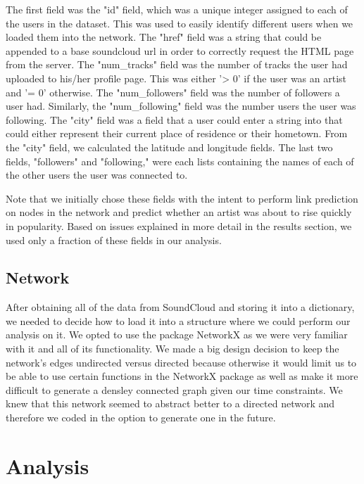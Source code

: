 \documentclass{article}
\begin{document}
The first field was the "id" field, which was a unique integer assigned to each of the users in the dataset.  This was used to easily identify different users when we loaded them into the network.  The "href" field was a string that could be appended to a base soundcloud url in order to correctly request the HTML page from the server.  The "num\_tracks" field was the number of tracks the user had uploaded to his/her profile page.  This was either '> 0' if the user was an artist and '= 0' otherwise.  The "num\_followers" field was the number of followers a user had.  Similarly, the "num\_following" field was the number users the user was following.  The "city" field was a field that a user could enter a string into that could either represent their current place of residence or their hometown.  From the "city" field, we calculated the latitude and longitude fields.  The last two fields, "followers" and "following," were each lists containing the names of each of the other users the user was connected to.

Note that we initially chose these fields with the intent to perform link prediction on nodes in the network and predict whether an artist was about to rise quickly in popularity.  Based on issues explained in more detail in the results section, we used only a fraction of these fields in our analysis.

\subsection{Network}

After obtaining all of the data from SoundCloud and storing it into a dictionary, we needed to decide how to load it into a structure where we could perform our analysis on it. We opted to use the package NetworkX as we were very familiar with it and all of its functionality.  We made a big design decision to keep the network's edges undirected versus directed because otherwise it would limit us to be able to use certain functions in the NetworkX package as well as make it more difficult to generate a densley connected graph given our time constraints.  We knew that this network seemed to abstract better to a directed network and therefore we coded in the option to generate one in the future.

\section{Analysis}
\end{document}
